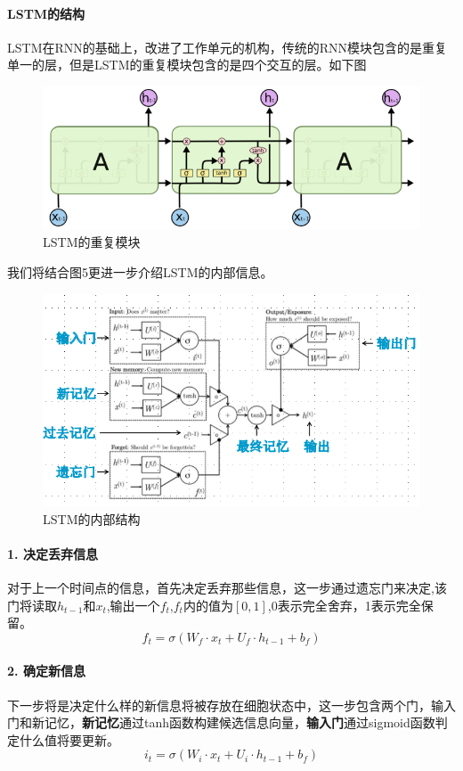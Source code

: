 \documentclass[UTF8]{ctexart}
\begin{document}
\paragraph*{LSTM的结构}
LSTM在RNN的基础上，改进了工作单元的机构，传统的RNN模块包含的是重复单一的层，但是LSTM的重复模块包含的是四个交互的层。如下图
\begin{figure}[!htbp]
    \centering
    \includegraphics[scale = 0.8]{p4.png}
    \caption{LSTM的重复模块\cite{1}}
\end{figure}
我们将结合图5更进一步介绍LSTM的内部信息。
\begin{figure}[!htbp]
    \centering
    \includegraphics[scale = 0.8]{p5.png}
    \caption{LSTM的内部结构\cite{2}}
\end{figure}
\paragraph{1. 决定丢弃信息}对于上一个时间点的信息，首先决定丢弃那些信息，这一步通过遗忘门来决定,该门将读取$h_{t-1}$和$x_t$,输出一个$f_t$,$f_t$内的值为$[0,1]$,0表示完全舍弃，1表示完全保留。
\begin{equation}\label{ft}
    f_t = \sigma(W_f\cdot x_t + U_f\cdot h_{t-1} + b_f)
\end{equation}

\paragraph*{2. 确定新信息}
下一步将是决定什么样的新信息将被存放在细胞状态中，这一步包含两个门，输入门和新记忆，\textbf{新记忆}通过tanh函数构建候选信息向量，\textbf{输入门}通过sigmoid函数判定什么值将要更新。
\begin{equation}\label{it}
    i_t  =\sigma (W_i\cdot x_t + U_i\cdot h_{t-1} + b_f)
\end{equation}
\end{document}
